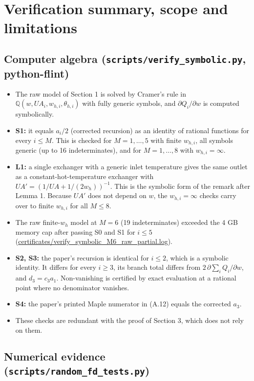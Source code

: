 \documentclass[11pt,a4paper]{report}
\begin{document}
\section{Verification summary, scope and limitations}

\subsection{\texorpdfstring{Computer algebra (\texttt{scripts/verify\_symbolic.py}, python-flint)}{Computer algebra (scripts/verify\_symbolic.py, python-flint)}}

\begin{itemize}
\item The raw model of Section 1 is solved by Cramer's rule in \(\mathbb{Q}(w, UA_i, w_{h,i}, \theta_{h,i})\) with fully
generic symbols, and \(\partial Q_i/\partial w\) is computed symbolically.
\item \textbf{S1:} it equals \(a_i/2\) (corrected recursion) as an identity of rational functions for every
\(i \le M\). This is checked for \(M = 1,\dots,5\) with finite \(w_{h,i}\), all symbols generic (up to 16
indeterminates), and for \(M = 1,\dots,8\) with \(w_{h,i} = \infty\).
\item \textbf{L1:} a single exchanger with a generic inlet temperature gives the same outlet as a
constant-hot-temperature exchanger with \(UA' = (1/UA + 1/(2w_h))^{-1}\). This is the symbolic form of the remark after
Lemma 1. Because \(UA'\) does not depend on \(w\), the \(w_{h,i} = \infty\) checks carry over to finite \(w_{h,i}\) for
all \(M \le 8\).
\item The raw finite-\(w_h\) model at \(M = 6\) (19 indeterminates) exceeded the 4 GB memory cap after passing S0 and
S1 for \(i \le 5\) (\url{certificates/verify_symbolic_M6_raw_partial.log}).
\item \textbf{S2, S3:} the paper's recursion is identical for \(i \le 2\), which is a symbolic identity. It differs for
every \(i \ge 3\), its branch total differs from \(2\,\partial\sum_i Q_i/\partial w\), and \(d_3 = c_3a_1\).
Non-vanishing is certified by exact evaluation at a rational point where no denominator vanishes.
\item \textbf{S4:} the paper's printed Maple numerator in (A.12) equals the corrected \(a_3\).
\item These checks are redundant with the proof of Section 3, which does not rely on them.
\end{itemize}

\subsection{\texorpdfstring{Numerical evidence (\texttt{scripts/random\_fd\_tests.py})}{Numerical evidence (scripts/random\_fd\_tests.py)}}
\end{document}
